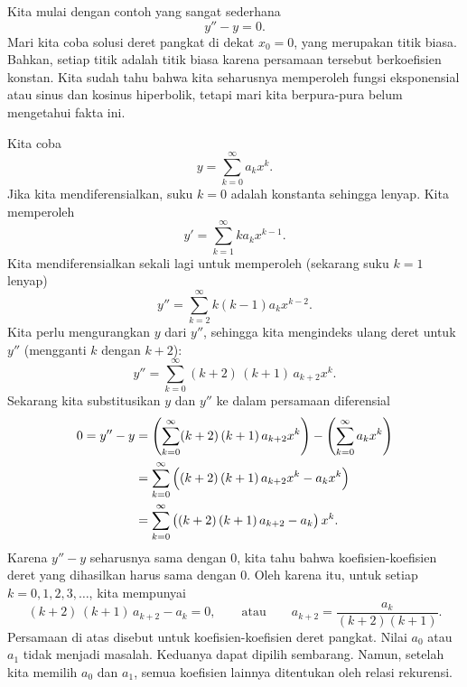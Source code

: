 \begin{example}
Kita mulai dengan contoh yang sangat sederhana
\begin{equation*}
y'' - y = 0 .
\end{equation*}
Mari kita coba solusi deret pangkat di dekat $x_0 = 0$,
yang merupakan titik biasa. Bahkan, setiap titik adalah titik
biasa karena persamaan tersebut berkoefisien konstan. Kita sudah tahu
bahwa kita seharusnya memperoleh fungsi eksponensial atau sinus dan kosinus hiperbolik,
tetapi mari kita berpura-pura belum mengetahui fakta ini.

Kita coba
\begin{equation*}
y = \sum_{k=0}^\infty a_k x^k .
\end{equation*}
Jika kita mendiferensialkan, suku $k=0$ adalah konstanta sehingga lenyap.
Kita memperoleh
\begin{equation*}
y' = \sum_{k=1}^\infty k a_k x^{k-1} .
\end{equation*}
Kita mendiferensialkan sekali lagi untuk memperoleh (sekarang suku $k=1$ lenyap)
\begin{equation*}
y'' = \sum_{k=2}^\infty k(k-1) a_k x^{k-2} .
\end{equation*}
Kita perlu mengurangkan $y$ dari $y''$, sehingga 
kita mengindeks ulang deret untuk $y''$ (mengganti $k$ dengan $k+2$):
\begin{equation*}
y'' = \sum_{k=0}^\infty (k+2)\,(k+1) \, a_{k+2} x^k .
\end{equation*}
Sekarang kita substitusikan $y$ dan $y''$ ke dalam persamaan diferensial
\begin{equation*}
\begin{split}
0 = y''-y & = 
\Biggl( \sum_{k=0}^\infty (k+2)\,(k+1) \, a_{k+2} x^k  \Biggr)
-
\Biggl( \sum_{k=0}^\infty a_k x^k \Biggr)
\\
& =
\sum_{k=0}^\infty \,\Bigl( (k+2)\,(k+1) \, a_{k+2} x^k 
-
a_k x^k \Bigr)
\\
& =
\sum_{k=0}^\infty \,\bigl( (k+2)\,(k+1) \,a_{k+2} - a_k \bigr) \, x^k  .
\end{split}
\end{equation*}
Karena $y'' - y$ seharusnya sama dengan 0, kita tahu bahwa
koefisien-koefisien deret yang dihasilkan harus sama dengan 0. Oleh karena itu,
untuk setiap $k=0,1,2,3,\ldots$, kita mempunyai
\begin{equation*}
(k+2)\,(k+1) \,a_{k+2} - a_k = 0 ,
\qquad
\text{atau}
\qquad
a_{k+2} = \frac{a_k}{(k+2)(k+1)} .
\end{equation*}
Persamaan di atas disebut \emph{}
untuk koefisien-koefisien deret pangkat.
Nilai $a_0$ atau $a_1$ tidak menjadi masalah. Keduanya dapat dipilih sembarang.
Namun, setelah kita memilih $a_0$ dan $a_1$, semua koefisien lainnya
ditentukan oleh relasi rekurensi.


\end{example}
